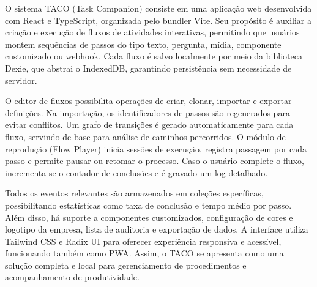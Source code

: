 O sistema TACO (Task Companion) \cite{taco_repo} consiste em uma aplicação web desenvolvida com React e TypeScript, organizada pelo bundler Vite. Seu propósito é auxiliar a criação e execução de fluxos de atividades interativas, permitindo que usuários montem sequências de passos do tipo texto, pergunta, mídia, componente customizado ou webhook. Cada fluxo é salvo localmente por meio da biblioteca Dexie, que abstrai o IndexedDB, garantindo persistência sem necessidade de servidor.

O editor de fluxos possibilita operações de criar, clonar, importar e exportar definições. Na importação, os identificadores de passos são regenerados para evitar conflitos. Um grafo de transições é gerado automaticamente para cada fluxo, servindo de base para análise de caminhos percorridos. O módulo de reprodução (Flow Player) inicia sessões de execução, registra passagem por cada passo e permite pausar ou retomar o processo. Caso o usuário complete o fluxo, incrementa-se o contador de conclusões e é gravado um log detalhado.

Todos os eventos relevantes são armazenados em coleções específicas, possibilitando estatísticas como taxa de conclusão e tempo médio por passo. Além disso, há suporte a componentes customizados, configuração de cores e logotipo da empresa, lista de auditoria e exportação de dados. A interface utiliza Tailwind CSS e Radix UI para oferecer experiência responsiva e acessível, funcionando também como PWA. Assim, o TACO se apresenta como uma solução completa e local para gerenciamento de procedimentos e acompanhamento de produtividade.
